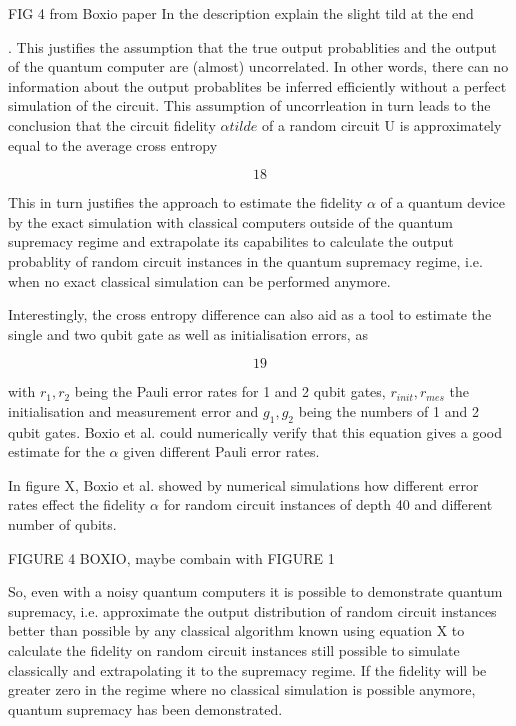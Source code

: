 FIG 4 from Boxio paper In the description explain the slight tild at the end

. This justifies the assumption that the true output probablities and the output
of the quantum computer are (almost) uncorrelated. In other words, there can no
information about the output probablites be inferred efficiently without a
perfect simulation of the circuit. This assumption of uncorrleation in turn
leads to the conclusion that the circuit fidelity $\alpha tilde$ of a random
circuit U is approximately equal to the average cross entropy

\begin{equation}
 18
\end{equation}

This in turn justifies the approach to estimate the fidelity $\alpha$ of a
quantum device by the exact simulation with classical computers outside of the
quantum supremacy regime and extrapolate its capabilites to calculate the output
probablity of random circuit instances in the quantum supremacy regime, i.e.
when no exact classical simulation can be performed anymore.

Interestingly, the cross entropy difference can also aid as a tool to estimate
the single and two qubit gate as well as initialisation errors, as

\begin{equation}
  19
\end{equation}

with $r_1, r_2$ being the Pauli error rates for 1 and 2 qubit gates, $r_{init},
r_{mes}$ the initialisation and measurement error and $g_1,g_2$ being the
numbers of 1 and 2 qubit gates. Boxio et al. could numerically verify that this
equation gives a good estimate for the $\alpha$ given different Pauli error rates.

In figure X, Boxio et al. showed by numerical
simulations how different error rates effect the fidelity $\alpha$ for random
circuit instances of depth 40 and different number of qubits.

FIGURE 4 BOXIO, maybe combain with FIGURE 1

So, even with a noisy quantum computers it is possible to demonstrate quantum
supremacy, i.e. approximate the output distribution of random circuit instances
better than possible by any classical algorithm known using equation X to
calculate the fidelity on random circuit instances still possible to simulate
classically and extrapolating it to the supremacy regime. If the fidelity will
be greater zero in the regime where no classical simulation is possible anymore,
quantum supremacy has been demonstrated.

